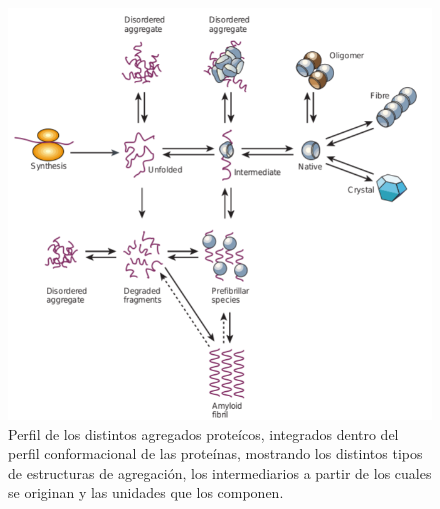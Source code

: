 \begin{figure}[h!,centered]
\includegraphics[width=\textwidth]{img/aggregationDiagram.png} 
\caption{Perfil de los distintos agregados proteícos, integrados dentro del perfil conformacional de las proteínas, mostrando los distintos tipos de estructuras de agregación, 
los intermediarios a partir de los cuales se originan y las unidades que los componen.
} \label{aggregationDiagram}
\end{figure}


